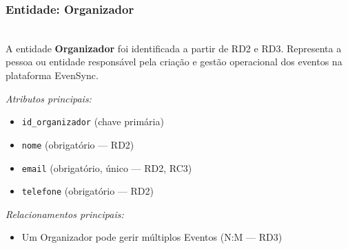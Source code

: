 \documentclass[runningheads]{llncs}
\begin{document}
                \vspace{0.4cm}
                \noindent\begin{minipage}{\textwidth}
                \subsubsection{Entidade: Organizador}\mbox{}\\
                A entidade \textbf{Organizador} foi identificada a partir de RD2 e RD3. Representa a
                pessoa ou entidade responsável pela criação e gestão operacional dos eventos na
                plataforma EvenSync.

                \vspace{0.2cm}
                \noindent\textit{Atributos principais:}
                \begin{itemize}
                    \item \texttt{id\_organizador} (chave primária)
                    \item \texttt{nome} (obrigatório --- RD2)
                    \item \texttt{email} (obrigatório, único --- RD2, RC3)
                    \item \texttt{telefone} (obrigatório --- RD2)
                \end{itemize}

                \vspace{0.2cm}
                \noindent\textit{Relacionamentos principais:}
                \begin{itemize}
                    \item Um Organizador pode gerir múltiplos Eventos (N:M --- RD3)
                \end{itemize}
                \end{minipage}
\end{document}
